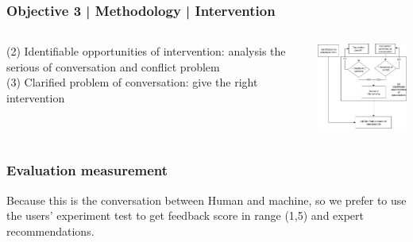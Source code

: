 \documentclass{beamer}
\begin{document}
\begin{frame}
\frametitle{Objective 3 | Methodology | Intervention}
\begin{columns}
	
	\begin{column}{.45\textwidth}
		(2) Identifiable opportunities of intervention: analysis the serious of conversation and conflict problem \\
		
		
		(3) Clarified problem of conversation: give the right intervention\\
	
	\end{column}
	\begin{column}{.55\textwidth}
		\includegraphics[width=50mm]{tsv3.png}	
	\end{column}
	
\end{columns}
\end{frame}

\begin{frame}
\frametitle{Evaluation measurement}
Because this is the conversation between Human and machine, so we prefer to use the users' experiment test to get feedback score in range (1,5) and expert recommendations.


\end{frame}
\end{document}
